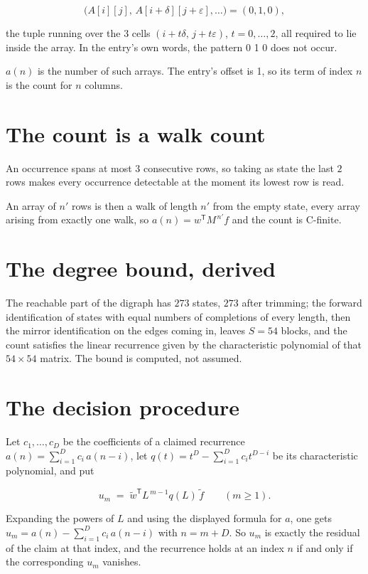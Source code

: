 \documentclass[11pt]{article}
\theoremstyle{definition}
\begin{document}
\[\bigl(A[i][j],\,A[i{+}\delta][j{+}\varepsilon],\dots\bigr) = (0, 1, 0),\]

the tuple running over the $3$ cells $(i+t\delta,\,j+t\varepsilon)$, $t = 0,\dots,2$, all required to lie inside the array. In the entry's own words, the pattern 0 1 0 does not occur.

$a(n)$ is the number of such arrays. The entry's offset is 1, so its term of index $n$ is the count for $n$ columns.

\section{The count is a walk count}

An occurrence spans at most $3$ consecutive rows, so taking as state the last $2$ rows makes every occurrence detectable at the moment its lowest row is read.

An array of $n'$ rows is then a walk of length $n'$ from the empty state, every array arising from exactly one walk, so $a(n) = w^{\mathsf T}M^{\,n'}f$ and the count is C-finite.

\section{The degree bound, derived}

The reachable part of the digraph has $273$ states, $273$ after trimming; the forward identification of states with equal numbers of completions of every length, then the mirror identification on the edges coming in, leaves $S = 54$ blocks, and the count satisfies the linear recurrence given by the characteristic polynomial of that $54\times54$ matrix. The bound is computed, not assumed.

\section{The decision procedure}

Let $c_1,\dots,c_D$ be the coefficients of a claimed recurrence $a(n) = \sum_{i=1}^{D} c_i\,a(n-i)$, let $q(t) = t^{D} - \sum_{i=1}^{D} c_i t^{D-i}$ be its characteristic polynomial, and put

\[u_m \;=\; \tilde w^{\mathsf T} L^{\,m-1} q(L)\,\tilde f \qquad (m \ge 1).\]

Expanding the powers of $L$ and using the displayed formula for $a$, one gets $u_m = a(n) - \sum_{i=1}^{D} c_i\,a(n-i)$ with $n = m + D$. So $u_m$ is exactly the residual of the claim at that index, and the recurrence holds at an index $n$ if and only if the corresponding $u_m$ vanishes.
\end{document}
